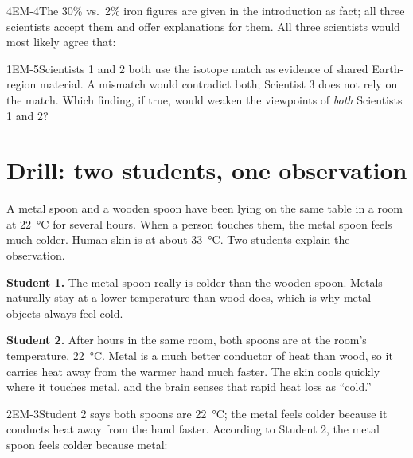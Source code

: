 \documentclass[11pt]{article}
\begin{document}
\begin{q}{4}{EM-4}{The 30\% vs.\ 2\% iron figures are given in the introduction as fact; all three scientists accept them and offer explanations for them.}
All three scientists would most likely agree that:
\end{q}

\begin{q}{1}{EM-5}{Scientists 1 and 2 both use the isotope match as evidence of shared Earth-region material. A mismatch would contradict both; Scientist 3 does not rely on the match.}
Which finding, if true, would weaken the viewpoints of \emph{both} Scientists 1 and 2?
\end{q}

\section{Drill: two students, one observation}

A metal spoon and a wooden spoon have been lying on the same table in a room at \SI{22}{\celsius} for several hours. When a person touches them, the metal spoon feels much colder. Human skin is at about \SI{33}{\celsius}. Two students explain the observation.

\textbf{Student 1.} The metal spoon really is colder than the wooden spoon. Metals naturally stay at a lower temperature than wood does, which is why metal objects always feel cold.

\textbf{Student 2.} After hours in the same room, both spoons are at the room's temperature, \SI{22}{\celsius}. Metal is a much better conductor of heat than wood, so it carries heat away from the warmer hand much faster. The skin cools quickly where it touches metal, and the brain senses that rapid heat loss as ``cold.''
\passageend

\begin{q}{2}{EM-3}{Student 2 says both spoons are \SI{22}{\celsius}; the metal feels colder because it conducts heat away from the hand faster.}
According to Student 2, the metal spoon feels colder because metal:
\end{q}
\end{document}
